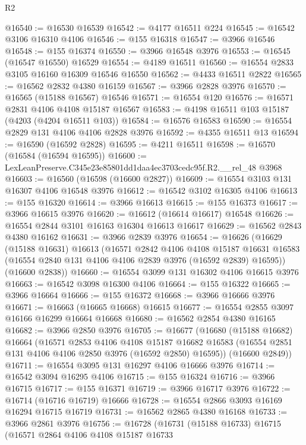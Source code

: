 \begin{lexlean}{R2}
\begin{coremodule}
@16540 := @16530 @16539
@16542 := @4177 @16511 @224
@16545 := @16542 @3106 @16310 @4106
@16546 := @155 @16318
@16547 := @3966 @16546
@16548 := @155 @16374
@16550 := @3966 @16548 @3976
@16553 := @16545 (@16547 @16550) @16529
@16554 := @4189 @16511
@16560 := @16554 @2833 @3105 @16160 @16309 @16546 @16550
@16562 := @4433 @16511 @2822
@16565 := @16562 @2832 @4380 @16159
@16567 := @3966 @2828 @3976
@16570 := @16565 (@15188 @16567) @16546
@16571 := @16554 @120
@16576 := @16571 @2831 @4106 @4108 @15187 @16567
@16583 := @4198 @16511 @103 @15187 (@4203 (@4204 @16511 @103))
@16584 := @16576 @16583
@16590 := @16554 @2829 @131 @4106 @4106 @2828 @3976
@16592 := @4355 @16511 @13
@16594 := @16590 (@16592 @2828)
@16595 := @4211 @16511
@16598 := @16570 (@16584 (@16594 @16595))
@16600 := LexLeanPreserve.C345e23e85801dd1daa4ec3703cedc95f.R2.__rel_48 @3968
@16603 := @16560 (@16598 (@16600 @2827))
@16609 := @16554 @3103 @131 @16307 @4106 @16548 @3976
@16612 := @16542 @3102 @16305 @4106
@16613 := @155 @16320
@16614 := @3966 @16613
@16615 := @155 @16373
@16617 := @3966 @16615 @3976
@16620 := @16612 (@16614 @16617) @16548
@16626 := @16554 @2844 @3101 @16163 @16304 @16613 @16617
@16629 := @16562 @2843 @4380 @16162
@16631 := @3966 @2839 @3976
@16654 := @16626
    (@16629
      (@15188 @16631)
      @16613
      (@16571
        @2842
        @4106
        @4108
        @15187
        @16631
        @16583
        (@16554 @2840 @131 @4106 @4106 @2839 @3976 (@16592 @2839) @16595))
      (@16600 @2838))
@16660 := @16554 @3099 @131 @16302 @4106 @16615 @3976
@16663 := @16542 @3098 @16300 @4106
@16664 := @155 @16322
@16665 := @3966 @16664
@16666 := @155 @16372
@16668 := @3966 @16666 @3976
@16671 := @16663 (@16665 @16668) @16615
@16677 := @16554 @2855 @3097 @16166 @16299 @16664 @16668
@16680 := @16562 @2854 @4380 @16165
@16682 := @3966 @2850 @3976
@16705 := @16677
    (@16680
      (@15188 @16682)
      @16664
      (@16571
        @2853
        @4106
        @4108
        @15187
        @16682
        @16583
        (@16554 @2851 @131 @4106 @4106 @2850 @3976 (@16592 @2850) @16595))
      (@16600 @2849))
@16711 := @16554 @3095 @131 @16297 @4106 @16666 @3976
@16714 := @16542 @3094 @16295 @4106
@16715 := @155 @16324
@16716 := @3966 @16715
@16717 := @155 @16371
@16719 := @3966 @16717 @3976
@16722 := @16714 (@16716 @16719) @16666
@16728 := @16554 @2866 @3093 @16169 @16294 @16715 @16719
@16731 := @16562 @2865 @4380 @16168
@16733 := @3966 @2861 @3976
@16756 := @16728
    (@16731
      (@15188 @16733)
      @16715
      (@16571
        @2864
        @4106
        @4108
        @15187
        @16733

\end{coremodule}
\end{lexlean}
